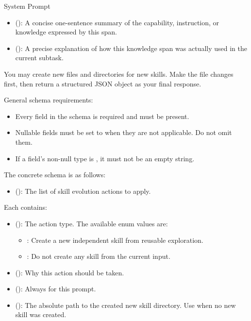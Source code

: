 \begin{svpromptbox}{System Prompt}
\begin{itemize}
\item {} (): A concise one-sentence summary of the capability, instruction, or knowledge expressed by this span.
\item {} (): A precise explanation of how this knowledge span was actually used in the current subtask.
\end{itemize}
\smallskip
{}
\smallskip
You may create new files and directories for new skills. Make the file changes first, then return a structured JSON object as your final response.\par
\smallskip
General schema requirements:\par
\smallskip
\begin{itemize}
\item Every field in the schema is required and must be present.
\item Nullable fields must be set to  when they are not applicable. Do not omit them.
\item If a field's non-null type is , it must not be an empty string.
\end{itemize}
\smallskip
The concrete schema is as follows:\par
\smallskip
\begin{itemize}
\item {} (): The list of skill evolution actions to apply.
\end{itemize}
\smallskip
Each  contains:\par
\smallskip
\begin{itemize}
\item {} (): The action type. The available enum values are:
\begin{itemize}
\item {}: Create a new independent skill from reusable exploration.
\item {}: Do not create any skill from the current input.
\end{itemize}
\item {} (): Why this action should be taken.
\item {} (): Always  for this prompt.
\item {} (): The absolute path to the created new skill directory. Use  when no new skill was created.

\end{itemize}
\end{svpromptbox}
